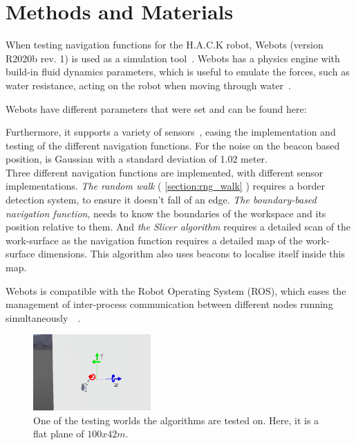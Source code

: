 \section{Methods and Materials}

When testing navigation functions for the H.A.C.K robot, Webots (version R2020b rev. 1) is used as a simulation tool~\cite{Webots}. Webots has a physics engine with build-in fluid dynamics parameters, which is useful to emulate the forces, such as water resistance, acting on the robot when moving through water~\cite{WebotsRef}.

Webots have different parameters that were set and can be found here:\cite{ProjectGithub}


Furthermore, it supports a variety of sensors~\cite{WebotsRef}, easing the implementation and testing of the different navigation functions. For the noise on the beacon based position, is Gaussian with a standard deviation of 1.02 meter.\\

Three different navigation functions are implemented, with different sensor implementations. \textit{The random walk} ( \ref{section:rng_walk} ) requires a border detection system, to ensure it doesn't fall of an edge. \textit{The boundary-based navigation function}, needs to know the boundaries of the workspace and its position relative to them. And \textit{the Slicer algorithm} requires a detailed scan of the work-surface as the navigation function requires a detailed map of the work-surface dimensions. This algorithm also uses beacons to localise itself inside this map.

Webots is compatible with the Robot Operating System (ROS), which eases the management of inter-process communication between different nodes running simultaneously~\cite{WebotsRef}~\cite{ROSTech}.

\begin{figure}[ht]
    \captionsetup{justification=centering}
    \centering
    \includegraphics[width=0.4\textwidth]{Figures/rob_fig.png}
    \caption{One of the testing worlds the algorithms are tested on. Here, it is a flat plane of $100x42m$.}
    \label{fig:example_test_world}
\end{figure}

